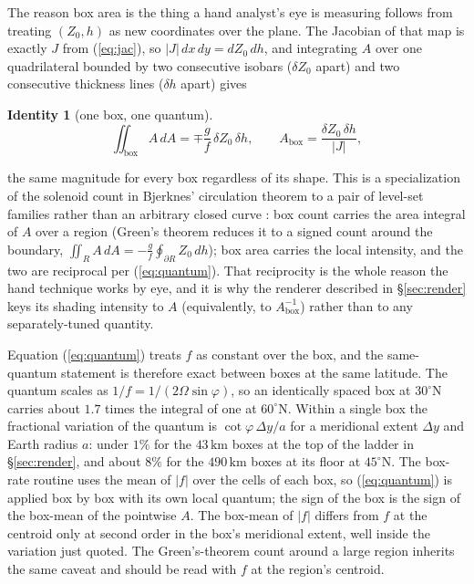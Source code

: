 \documentclass[11pt]{article}
\newtheorem*{identity}{Identity}
\newcommand{\km}{\ensuremath{\,\mathrm{km}}}
\begin{document}
The reason box area is the thing a hand analyst's eye is measuring follows from treating $(Z_0, h)$ as new coordinates over the plane. The Jacobian of that map is exactly $J$ from (\ref{eq:jac}), so $|J|\,dx\,dy = dZ_0\,dh$, and integrating $A$ over one quadrilateral bounded by two consecutive isobars ($\delta Z_0$ apart) and two consecutive thickness lines ($\delta h$ apart) gives
\begin{identity}[one box, one quantum]
\begin{equation}
\iint_{\mathrm{box}} A\,dA = \mp\frac{g}{f}\,\delta Z_0\,\delta h,
\qquad
A_{\mathrm{box}} = \frac{\delta Z_0\,\delta h}{|J|},
\label{eq:quantum}
\end{equation}
\end{identity}
\noindent the same magnitude for every box regardless of its shape. This is a specialization of the solenoid count in Bjerknes' circulation theorem to a pair of level-set families rather than an arbitrary closed curve \citep{bjerknes1898,lackmann2011}: box count carries the area integral of $A$ over a region (Green's theorem reduces it to a signed count around the boundary, $\iint_R A\,dA = -\frac{g}{f}\oint_{\partial R} Z_0\,dh$); box area carries the local intensity, and the two are reciprocal per (\ref{eq:quantum}). That reciprocity is the whole reason the hand technique works by eye, and it is why the renderer described in \S\ref{sec:render} keys its shading intensity to $A$ (equivalently, to $A_{\mathrm{box}}^{-1}$) rather than to any separately-tuned quantity.

Equation (\ref{eq:quantum}) treats $f$ as constant over the box, and the same-quantum statement is therefore exact between boxes at the same latitude. The quantum scales as $1/f = 1/(2\Omega\sin\varphi)$, so an identically spaced box at $30^\circ$N carries about $1.7$ times the integral of one at $60^\circ$N. Within a single box the fractional variation of the quantum is $\cot\varphi\,\Delta y/a$ for a meridional extent $\Delta y$ and Earth radius $a$: under $1\%$ for the $43\km$ boxes at the top of the ladder in \S\ref{sec:render}, and about $8\%$ for the $490\km$ boxes at its floor at $45^\circ$N. The box-rate routine uses the mean of $|f|$ over the cells of each box, so (\ref{eq:quantum}) is applied box by box with its own local quantum; the sign of the box is the sign of the box-mean of the pointwise $A$. The box-mean of $|f|$ differs from $f$ at the centroid only at second order in the box's meridional extent, well inside the variation just quoted. The Green's-theorem count around a large region inherits the same caveat and should be read with $f$ at the region's centroid.
\end{document}
